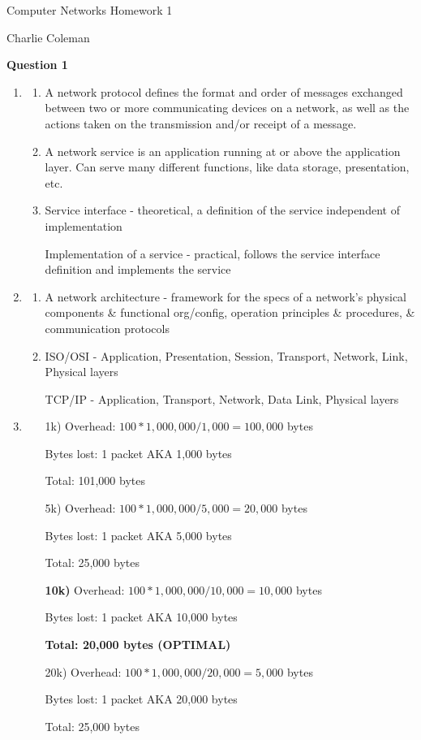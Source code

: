 \documentclass[12pt]{article}
\begin{document}
	\begin{center}
		\begin{large}
			Computer Networks Homework 1
		\end{large}
	\end{center}
	
	\hfill Charlie Coleman
	
	\noindent \textbf{Question 1}
	
	\begin{enumerate}[nolistsep]
		\item \begin{enumerate} [nolistsep]
			\item A network protocol defines the format and order of messages exchanged between two or more communicating devices on a network, as well as the actions taken on the transmission and/or receipt of a message.
			\item A network service is an application running at or above the application layer. Can serve many different functions, like data storage, presentation, etc.
			\item Service interface - theoretical, a definition of the service independent of implementation
			
			Implementation of a service - practical, follows the service interface definition and implements the service
		\end{enumerate}
		\item \begin{enumerate}
			\item A network architecture - framework for the specs of a network's physical components \& functional org/config, operation principles \& procedures, \& communication protocols
			\item ISO/OSI - Application, Presentation, Session, Transport, Network, Link, Physical layers
			
			TCP/IP - Application, Transport, Network, Data Link, Physical layers
		\end{enumerate}
		\item \begin{enumerate}
			\item[1k)] Overhead: $100*1,000,000/1,000 = 100,000$ bytes

			Bytes lost: 1 packet AKA 1,000 bytes
			
			Total: 101,000 bytes
			\item[5k)] Overhead: $100*1,000,000/5,000 = 20,000$ bytes
			
			Bytes lost: 1 packet AKA 5,000 bytes
			
			Total: 25,000 bytes
			\item[\textbf{10k)}] Overhead: $100*1,000,000/10,000 = 10,000$ bytes
			
			Bytes lost: 1 packet AKA 10,000 bytes
			
			\textbf{Total: 20,000 bytes (OPTIMAL)}
			\item[20k)] Overhead: $100*1,000,000/20,000 = 5,000$ bytes
			
			Bytes lost: 1 packet AKA 20,000 bytes
			
			Total: 25,000 bytes
		\end{enumerate}
	\end{enumerate}
	
\end{document}
